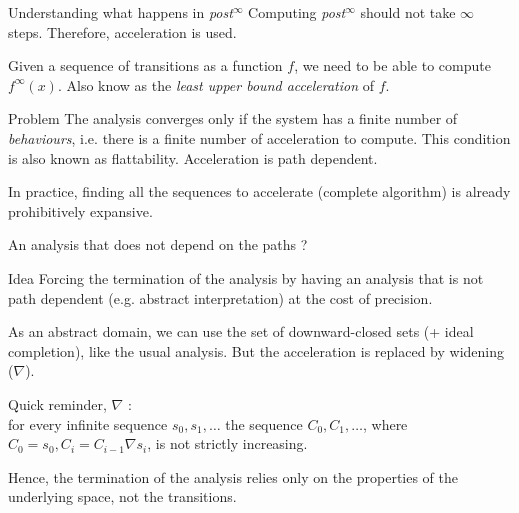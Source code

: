 \documentclass{beamer}
\begin{document}
\begin{frame}{Understanding what happens in \emph{post$^\infty$}}
Computing \emph{post$^\infty$} should not take $\infty$ steps. Therefore, \alert{acceleration} is used.

\vspace{10pt}

Given a sequence of transitions as a function $f$, we need to be able to compute $f^\infty(x)$.
Also know as the \emph{least upper bound acceleration} of $f$.

\vspace{10pt}

\begin{block}{Problem}
The analysis converges only if the system has a finite number of \emph{behaviours}, i.e. there is a finite number of acceleration to compute.
This condition is also known as \alert{flattability}.
Acceleration is path dependent.
\end{block}

\vspace{10pt}

In practice, finding all the sequences to accelerate (complete algorithm) is already prohibitively expansive.

\end{frame}

\begin{frame}{An analysis that does not depend on the paths ?}
  \begin{block}{Idea}
    Forcing the termination of the analysis by having an analysis that is not path dependent (e.g. abstract interpretation) at the cost of precision.
  \end{block}

  \vspace{10pt}

  As an abstract domain, we can use the set of downward-closed sets (+ ideal completion), like the usual analysis.
  But the acceleration is replaced by \alert{widening} ($\nabla$).
  
  \vspace{10pt}

  Quick reminder, $\nabla$ \cite{CousotCousot77AbstractInterpretation}:\\
  for every infinite sequence $s_0, s_1, \ldots$ the sequence $C_0, C_1, \ldots$, where $C_0 = s_0, C_i = C_{i-1} \nabla s_i$, is not strictly increasing.

  \vspace{10pt}

  Hence, the termination of the analysis relies only on the properties of the \alert{underlying space}, not the transitions.

\end{frame}
\end{document}
